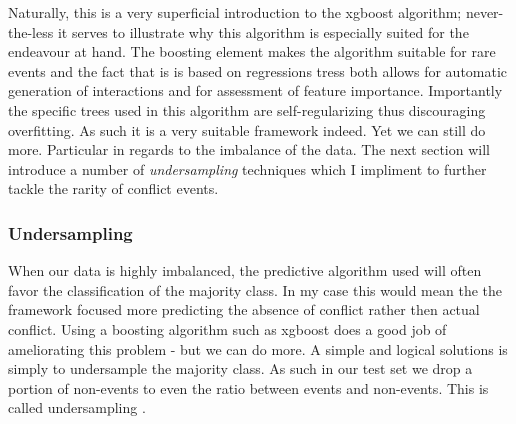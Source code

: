 \documentclass[a4paper]{article}
\begin{document}
Naturally, this is a very superficial introduction to the xgboost algorithm; never-the-less it serves to illustrate why this algorithm is especially suited for the endeavour at hand. The boosting element makes the algorithm suitable for rare events and the fact that is is based on regressions tress both allows for automatic generation of interactions and for assessment of feature importance. Importantly the specific trees used in this algorithm are  self-regularizing thus discouraging overfitting. As such it is a very suitable framework indeed. Yet we can still do more. Particular in regards to the imbalance of the data. The next section will introduce a number of \emph{undersampling} techniques which I impliment to further tackle the rarity of conflict events.\par 

\subsubsection{Undersampling}


When our data is highly imbalanced, the predictive algorithm used will often favor the classification of the majority class. In my case this would mean the the framework focused more predicting the absence of conflict rather then actual conflict. Using a boosting algorithm such as xgboost does a good job of ameliorating this problem - but we can do more. A simple and logical solutions is simply to undersample the majority class. As such in our test set we drop a portion of non-events to even the ratio between events and non-events. This is called undersampling \citep[1266-1267]{He_2008}. 
\end{document}
